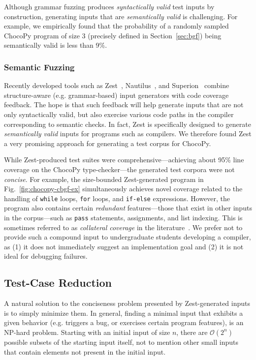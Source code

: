 \documentclass[conference]{IEEEtran}
\newcommand{\code}{\texttt}
\begin{document}
Although grammar fuzzing produces \emph{syntactically valid} test inputs by construction, generating inputs that are \emph{semantically valid} is challenging. For example, we empirically found that the probability of a randomly sampled ChocoPy program of size 3 (precisely defined in Section~\ref{sec:bgf}) being semantically valid is less than 9\%. 

\subsubsection{Semantic Fuzzing}

Recently developed tools such as Zest~\cite{Padhye19-zest},  Nautilus~\cite{Aschermann19}, and Superion~\cite{Wang19} combine structure-aware (e.g. grammar-based) input generators with code coverage feedback. The hope is that such feedback will help generate inputs that are not only syntactically valid, but also exercise various code paths in the compiler corresponding to semantic checks. In fact, Zest is specifically designed to generate \emph{semantically valid} inputs for programs such as compilers. We therefore found Zest a very promising approach for generating a test corpus for ChocoPy.

While Zest-produced test suites were comprehensive---achieving about 95\% line coverage on the ChocoPy type-checker---the generated test corpora were not \emph{concise}. 
For example, the size-bounded Zest-generated program in Fig.~\ref{fig:chocopy-cbgf-ex} simultaneously achieves novel coverage related to the handling of \code{while} loops, \code{for} loops, and \code{if-else} expressions. However, the program also contains certain \emph{redundant} features---those that exist in other inputs in the corpus---such as \code{pass} statements, assignments, and list indexing. This is sometimes referred to as \emph{collateral coverage} in the literature~\cite{Harman10}. We prefer not to provide such a compound input to undergraduate students developing a compiler, as (1) it does not immediately suggest an implementation goal and (2) it is not ideal for debugging failures.



\subsection{Test-Case Reduction}
\label{sec:related-reduction}

A natural solution to the conciseness problem presented by Zest-generated inputs is to simply minimize them. In general, finding a minimal input that exhibits a given behavior (e.g. triggers a bug, or exercises certain program features), is an NP-hard problem. Starting with an initial input of size $n$, there are $\mathcal{O}(2^n)$ possible subsets of the starting input itself, not to mention other small inputs that contain elements not present in the initial input.
\end{document}
